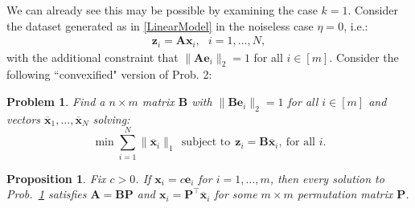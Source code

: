 \documentclass{ucbthesis}
\newtheorem{conjecture}{Conjecture}
\newtheorem{problem}{Problem}
\newtheorem{proposition}{Proposition}
\begin{document}
We can already see this may be possible by examining the case $k=1$. Consider the dataset generated as in \eqref{LinearModel} in the noiseless case $\eta = 0$, i.e.:
\begin{align}\label{LinearModel}
\mathbf{z}_i = \mathbf{A}\mathbf{x}_i,\ \ \  \text{$i=1,\ldots,N$},
\end{align}
with the additional constraint that $\|\mathbf{Ae}_i\|_2 = 1$ for all $i \in [m]$. Consider the following ``convexified" version of 
Prob. 2:

\begin{problem}\label{ConvexifiedOptimizationProblem}
Find a $n \times m$ matrix $\mathbf{B}$ with $\|\mathbf{Be}_i\|_2 = 1$ for all $i \in [m]$ and vectors \mbox{$\mathbf{\overline x}_1, \ldots, \mathbf{\overline x}_N$} solving:
\begin{equation}\label{l1min}
\min \sum_{i = 1}^N \|\mathbf{\overline x}_{i}\|_1 \ \
\text{subject to} \ \ \mathbf{z}_i = \mathbf{B}\mathbf{\overline x}_i, \ \text{for all $i$}.
\end{equation}
\end{problem}


\begin{proposition}
Fix $c > 0$. If $\mathbf{x}_i = c\mathbf{e}_i$ for $i = 1, \ldots, m$, then every solution to Prob.~\ref{ConvexifiedOptimizationProblem} satisfies $\mathbf{A} = \mathbf{BP}$ and $\mathbf{x}_i = \mathbf{P}^\top \mathbf{\overline x}_i$ for some $m \times m$ permutation matrix $\mathbf{P}$.
\end{proposition}
\end{document}
